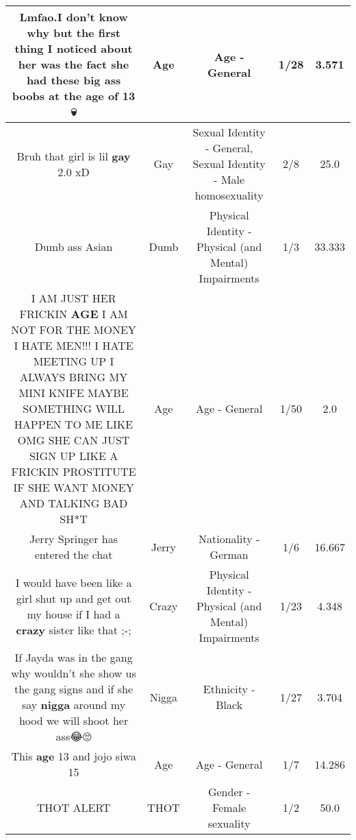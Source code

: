 \documentclass[11pt]{article}
\newlength\mylength
\begin{document}
\begin{center}
\begin{longtable}{|C{.65\mylength}|C{.30\mylength}|C{.12\mylength}|C{.12\mylength}|C{.12\mylength}|}
  \small Lmfao.I don't know why but the first thing I noticed about her was the fact she had these big ass boobs at the \textbf{age} of 13 💀\normalsize   & Age & Age - General & 1/28 & 3.571 \\  \hline
  \small Bruh that girl is lil \textbf{g\textbf{ay}} 2.0  xD\normalsize   & Gay & Sexual Identity - General, Sexual Identity - Male homosexuality & 2/8 & 25.0 \\  \hline
  \small Dumb ass Asian\normalsize   & Dumb & Physical Identity - Physical (and Mental) Impairments & 1/3 & 33.333 \\  \hline
  \small I AM JUST HER FRICKIN \textbf{AGE} I AM NOT FOR THE MONEY I HATE MEN!!! I HATE MEETING UP I ALWAYS BRING MY MINI KNIFE MAYBE SOMETHING WILL HAPPEN TO ME LIKE OMG SHE CAN JUST SIGN UP LIKE A FRICKIN PROSTITUTE IF SHE WANT MONEY AND TALKING BAD SH*T\normalsize   & Age & Age - General & 1/50 & 2.0 \\  \hline
  \small Jerry Springer has entered the chat\normalsize   & Jerry & Nationality - German & 1/6 & 16.667 \\  \hline
  \small I would have been like a girl shut up and get out my house if I had a \textbf{crazy} sister like that ;-;\normalsize   & Crazy & Physical Identity - Physical (and Mental) Impairments & 1/23 & 4.348 \\  \hline
  \small If Jayda was in the gang why wouldn't she show us the gang signs and if she say \textbf{nigga} around my hood we will shoot her ass😂🙄\normalsize   & Nigga & Ethnicity - Black & 1/27 & 3.704 \\  \hline
  \small This \textbf{age} 13 and jojo siwa 15\normalsize   & Age & Age - General & 1/7 & 14.286 \\  \hline
  \small THOT ALERT\normalsize   & THOT & Gender - Female sexuality & 1/2 & 50.0 \\  \hline

\end{longtable}
\end{center}
\end{document}
